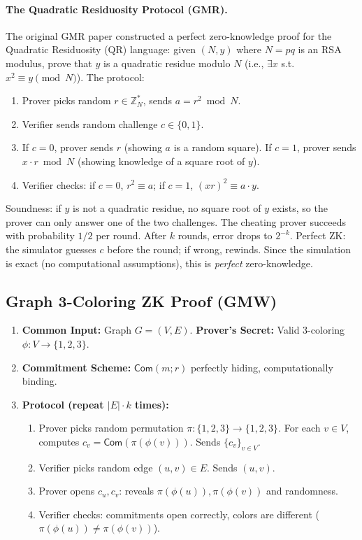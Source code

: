 \paragraph{The Quadratic Residuosity Protocol (GMR).} The original GMR paper constructed a perfect zero-knowledge proof for the Quadratic Residuosity (QR) language: given $(N, y)$ where $N = pq$ is an RSA modulus, prove that $y$ is a quadratic residue modulo $N$ (i.e., $\exists x$ s.t. $x^2 \equiv y \pmod{N}$). The protocol:
\begin{enumerate}
\item Prover picks random $r \in \mathbb{Z}_N^*$, sends $a = r^2 \bmod N$.
\item Verifier sends random challenge $c \in \{0,1\}$.
\item If $c=0$, prover sends $r$ (showing $a$ is a random square). If $c=1$, prover sends $x \cdot r \bmod N$ (showing knowledge of a square root of $y$).
\item Verifier checks: if $c=0$, $r^2 \equiv a$; if $c=1$, $(x r)^2 \equiv a \cdot y$.
\end{enumerate}
Soundness: if $y$ is not a quadratic residue, no square root of $y$ exists, so the prover can only answer one of the two challenges. The cheating prover succeeds with probability $1/2$ per round. After $k$ rounds, error drops to $2^{-k}$. Perfect ZK: the simulator guesses $c$ before the round; if wrong, rewinds. Since the simulation is exact (no computational assumptions), this is \emph{perfect} zero-knowledge.

\subsection{Graph 3-Coloring ZK Proof (GMW)}
\label{sec:zk:3color}

\begin{enumerate}
\item \textbf{Common Input:} Graph $G=(V,E)$. \textbf{Prover's Secret:} Valid 3-coloring $\phi: V \to \{1,2,3\}$.
\item \textbf{Commitment Scheme:} $\mathsf{Com}(m; r)$ perfectly hiding, computationally binding.
\item \textbf{Protocol (repeat $|E| \cdot k$ times):}
\begin{enumerate}
\item Prover picks random permutation $\pi: \{1,2,3\} \to \{1,2,3\}$. For each $v \in V$, computes $c_v = \mathsf{Com}(\pi(\phi(v)))$. Sends $\{c_v\}_{v \in V}$.
\item Verifier picks random edge $(u,v) \in E$. Sends $(u,v)$.
\item Prover opens $c_u, c_v$: reveals $\pi(\phi(u)), \pi(\phi(v))$ and randomness.
\item Verifier checks: commitments open correctly, colors are different ($\pi(\phi(u)) \neq \pi(\phi(v))$).
\end{enumerate}
\end{enumerate}

